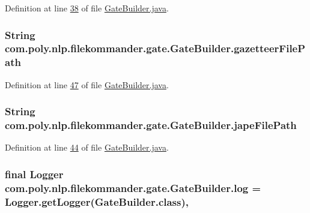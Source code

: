 Definition at line \hyperlink{L38}{38} of file \hyperlink{}{Gate\-Builder.\-java}.

\hypertarget{classcom_1_1poly_1_1nlp_1_1filekommander_1_1gate_1_1_gate_builder_adceaef80d20a83bd8c1cded83b90a692}{
\subsubsection[{gazetteer\-File\-Path}]{\setlength{\rightskip}{0pt plus 5cm}String com.\-poly.\-nlp.\-filekommander.\-gate.\-Gate\-Builder.\-gazetteer\-File\-Path\hspace{0.3cm}{\ttfamily [private]}}}\label{classcom_1_1poly_1_1nlp_1_1filekommander_1_1gate_1_1_gate_builder_adceaef80d20a83bd8c1cded83b90a692}


Definition at line \hyperlink{L47}{47} of file \hyperlink{}{Gate\-Builder.\-java}.

\hypertarget{classcom_1_1poly_1_1nlp_1_1filekommander_1_1gate_1_1_gate_builder_a58783e8638545aa5ea65a89aa1061dde}{
\subsubsection[{jape\-File\-Path}]{\setlength{\rightskip}{0pt plus 5cm}String com.\-poly.\-nlp.\-filekommander.\-gate.\-Gate\-Builder.\-jape\-File\-Path\hspace{0.3cm}{\ttfamily [private]}}}\label{classcom_1_1poly_1_1nlp_1_1filekommander_1_1gate_1_1_gate_builder_a58783e8638545aa5ea65a89aa1061dde}


Definition at line \hyperlink{L44}{44} of file \hyperlink{}{Gate\-Builder.\-java}.

\hypertarget{classcom_1_1poly_1_1nlp_1_1filekommander_1_1gate_1_1_gate_builder_abbd1c14bf5a3ef4f39d4563dd498c467}{
\subsubsection[{log}]{\setlength{\rightskip}{0pt plus 5cm}final Logger com.\-poly.\-nlp.\-filekommander.\-gate.\-Gate\-Builder.\-log = Logger.\-get\-Logger(Gate\-Builder.\-class)\hspace{0.3cm}{\ttfamily [static]}, {\ttfamily [private]}}}\label{classcom_1_1poly_1_1nlp_1_1filekommander_1_1gate_1_1_gate_builder_abbd1c14bf5a3ef4f39d4563dd498c467}


